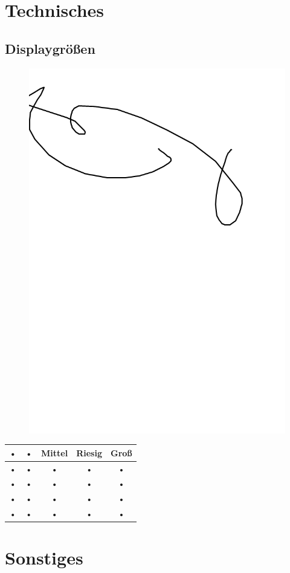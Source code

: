 \section*{Technisches}
\subsection*{Displaygrößen}
\begin{figure}[ht]
\includegraphics[scale=0.5]{mypicture.png}
\end{figure}

\begin{tabular}{|c|c|c|c|c|}
\hline 
• & • & Mittel & Riesig & Groß \\ 
\hline 
• & • & • & • & • \\ 
\hline 
• & • & • & • & • \\ 
\hline 
• & • & • & • & • \\ 
\hline 
• & • & • & • & • \\ 
\hline 
\end{tabular} 

\section*{Sonstiges}
